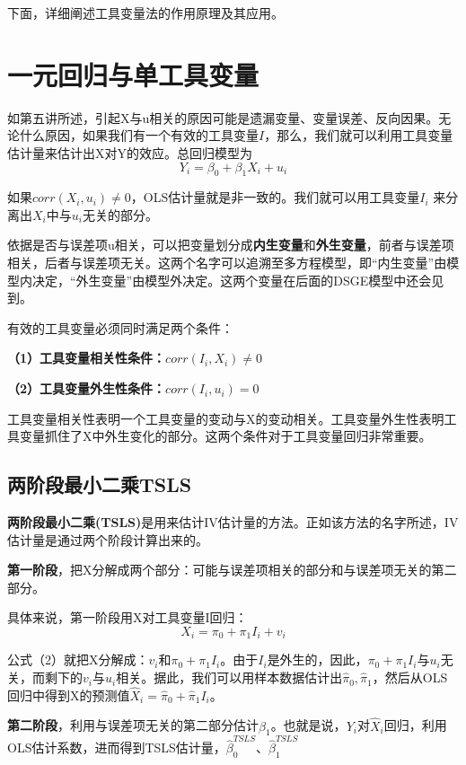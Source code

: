 \documentclass[cn,12pt,math=newtx,citestyle=gb7714-2015,bibstyle=gb7714-2015]{elegantbook}
\begin{document}
	下面，详细阐述工具变量法的作用原理及其应用。
	
	\section{一元回归与单工具变量}
	如第五讲所述，引起X与u相关的原因可能是遗漏变量、变量误差、反向因果。无论什么原因，如果我们有一个有效的工具变量$I$，那么，我们就可以利用工具变量估计量来估计出X对Y的效应。总回归模型为
	\begin{equation}
		Y_i=\beta_0+\beta_1X_i+u_i
	\end{equation}
	
	如果$corr(X_i,u_i)\neq0$，OLS估计量就是非一致的。我们就可以用工具变量$I_i$ 来分离出$X_i$中与$u_i$无关的部分。
	
	依据是否与误差项u相关，可以把变量划分成\textbf{内生变量}和\textbf{外生变量}，前者与误差项相关，后者与误差项无关。这两个名字可以追溯至多方程模型，即“内生变量”由模型内决定，“外生变量”由模型外决定。这两个变量在后面的DSGE模型中还会见到。
	
	有效的工具变量必须同时满足两个条件：
	
	\textbf{（1）工具变量相关性条件：$corr(I_i,X_i)\neq0$}
	
	\textbf{（2）工具变量外生性条件：$corr(I_i,u_i)=0$}
	
	工具变量相关性表明一个工具变量的变动与X的变动相关。工具变量外生性表明工具变量抓住了X中外生变化的部分。这两个条件对于工具变量回归非常重要。
	
	\subsection{两阶段最小二乘TSLS}
	\textbf{两阶段最小二乘(TSLS)}是用来估计IV估计量的方法。正如该方法的名字所述，IV估计量是通过两个阶段计算出来的。
	
	\textbf{第一阶段}，把X分解成两个部分：可能与误差项相关的部分和与误差项无关的第二部分。
	
	具体来说，第一阶段用X对工具变量I回归：
	\begin{equation}
		X_i=\pi_0+\pi_1I_i+v_i
	\end{equation}
	
	公式（2）就把X分解成：$v_i$和$\pi_0+\pi_1I_i$。由于$I_i$是外生的，因此，$\pi_0+\pi_1I_i$与$u_i$无关，而剩下的$v_i$与$u_i$相关。据此，我们可以用样本数据估计出$\hat{\pi}_0,\hat{\pi}_1$，然后从OLS回归中得到X的预测值$\hat{X}_i=\hat{\pi}_0+\hat{\pi}_1I_i$。
	
	\textbf{第二阶段}，利用与误差项无关的第二部分估计$\beta_1$。也就是说，$Y_i$对$\hat{X}_i$回归，利用OLS估计系数，进而得到TSLS估计量，$\hat{\beta}_0^{TSLS}、\hat{\beta}_1^{TSLS}$
	
\end{document}

